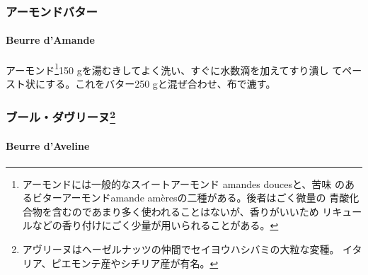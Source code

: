 \begin{recette}
\hypertarget{ux30a2ux30fcux30e2ux30f3ux30c9ux30d0ux30bfux30fc}{%
\subsubsection{アーモンドバター}\label{ux30a2ux30fcux30e2ux30f3ux30c9ux30d0ux30bfux30fc}}

\hypertarget{beurre-d-amande}{%
\paragraph{Beurre d'Amande}\label{beurre-d-amande}}


アーモンド\footnote{アーモンドには一般的なスイートアーモンド amandes
  doucesと、苦味 のあるビターアーモンドamande
  amèresの二種がある。後者はごく微量の
  青酸化合物を含むのであまり多く使われることはないが、香りがいいため
  リキュールなどの香り付けにごく少量が用いられることがある。}150
gを湯むきしてよく洗い、すぐに水数滴を加えてすり潰し
てペースト状にする。これをバター250 gと混ぜ合わせ、布で漉す。

\maeaki

\hypertarget{ux30d6ux30fcux30ebux30c0ux30f4ux30eaux30fcux30cc8}{%
\subsubsection[ブール・ダヴリーヌ]{\texorpdfstring{ブール・ダヴリーヌ\footnote{アヴリーヌはヘーゼルナッツの仲間でセイヨウハシバミの大粒な変種。
  イタリア、ピエモンテ産やシチリア産が有名。}}{ブール・ダヴリーヌ}}\label{ux30d6ux30fcux30ebux30c0ux30f4ux30eaux30fcux30cc8}}

\hypertarget{beurre-d-aveline}{%
\paragraph{Beurre d'Aveline}\label{beurre-d-aveline}}



\end{recette}
